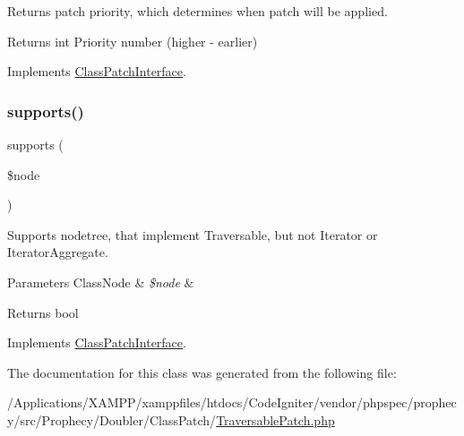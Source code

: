 Returns patch priority, which determines when patch will be applied.

\begin{DoxyReturn}{Returns}
int Priority number (higher -\/ earlier) 
\end{DoxyReturn}


Implements \mbox{\hyperlink{interface_prophecy_1_1_doubler_1_1_class_patch_1_1_class_patch_interface_a1e7a3c168dcd0901a0d2669c67575b55}{Class\+Patch\+Interface}}.

\mbox{\label{class_prophecy_1_1_doubler_1_1_class_patch_1_1_traversable_patch_a99b2455ac194faf79aff042c55719ac2}} 
\subsubsection{\texorpdfstring{supports()}{supports()}}
{\footnotesize\ttfamily supports (\begin{DoxyParamCaption}\item[{\mbox{\hyperlink{class_prophecy_1_1_doubler_1_1_generator_1_1_node_1_1_class_node}{Class\+Node}}}]{\$node }\end{DoxyParamCaption})}

Supports nodetree, that implement Traversable, but not Iterator or Iterator\+Aggregate.


\begin{DoxyParams}[1]{Parameters}
Class\+Node & {\em \$node} & \\
\hline
\end{DoxyParams}
\begin{DoxyReturn}{Returns}
bool 
\end{DoxyReturn}


Implements \mbox{\hyperlink{interface_prophecy_1_1_doubler_1_1_class_patch_1_1_class_patch_interface_a99b2455ac194faf79aff042c55719ac2}{Class\+Patch\+Interface}}.



The documentation for this class was generated from the following file\+:\begin{DoxyCompactItemize}
\item 
/\+Applications/\+X\+A\+M\+P\+P/xamppfiles/htdocs/\+Code\+Igniter/vendor/phpspec/prophecy/src/\+Prophecy/\+Doubler/\+Class\+Patch/\mbox{\hyperlink{_traversable_patch_8php}{Traversable\+Patch.\+php}}\end{DoxyCompactItemize}
